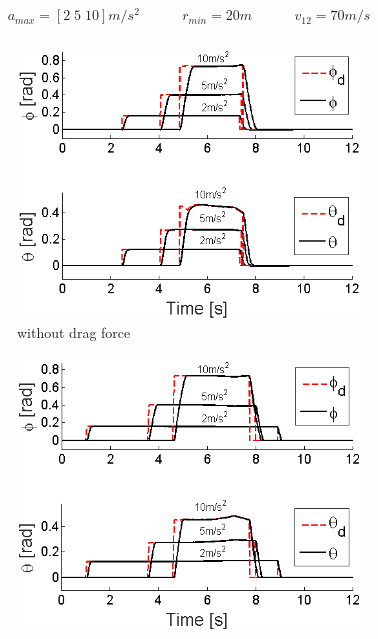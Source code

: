 \documentclass[journal,11pt,onecolumn,draftclsnofoot,]{IEEEtran}
\begin{document}
\begin{equation*}
\label{eq:safety_param}
\begin{split}
\begin{matrix}
a_{max} = \left[ 2 \; 5 \; 10 \right] m/s^2 \;\;\;\;\;\;\;\;&
r_{min} = 20m \;\;\;\;\;\;\;\;&
v_{12} = 70m/s \\
\end{matrix}
\end{split}
\end{equation*}

\begin{figure}
    \centering
    \begin{subfigure}{.47\columnwidth}
        \centering
        \includegraphics[width=\columnwidth]{roll_pitch_avoidance}
        \caption{without drag force}
        \label{fig:roll_pitch_avoidance_frictionless}
    \end{subfigure}
    \hfill
    \begin{subfigure}{.47\columnwidth}
        \centering
        \includegraphics[width=\columnwidth]{roll_pitch_avoidance_friction}

\end{subfigure}
\end{figure}
\end{document}
